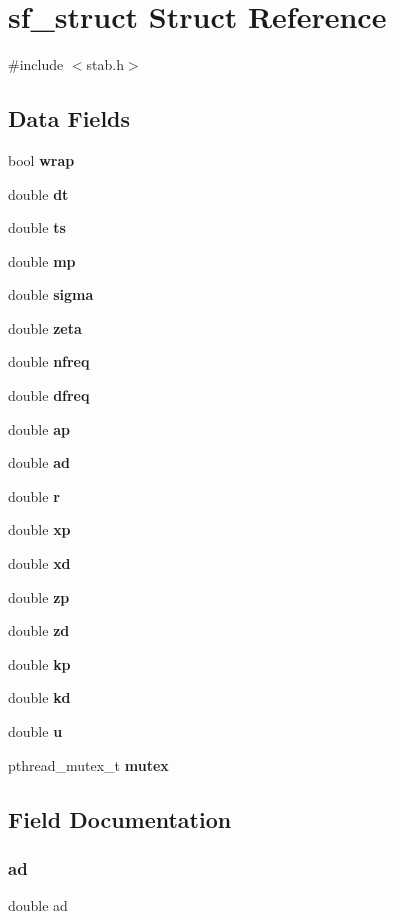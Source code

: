 \section{sf\+\_\+struct Struct Reference}
\label{structsf__struct}


{\ttfamily \#include $<$stab.\+h$>$}

\subsection*{Data Fields}
\begin{DoxyCompactItemize}
\item 
bool \textbf{ wrap}
\item 
double \textbf{ dt}
\item 
double \textbf{ ts}
\item 
double \textbf{ mp}
\item 
double \textbf{ sigma}
\item 
double \textbf{ zeta}
\item 
double \textbf{ nfreq}
\item 
double \textbf{ dfreq}
\item 
double \textbf{ ap}
\item 
double \textbf{ ad}
\item 
double \textbf{ r}
\item 
double \textbf{ xp}
\item 
double \textbf{ xd}
\item 
double \textbf{ zp}
\item 
double \textbf{ zd}
\item 
double \textbf{ kp}
\item 
double \textbf{ kd}
\item 
double \textbf{ u}
\item 
pthread\+\_\+mutex\+\_\+t \textbf{ mutex}
\end{DoxyCompactItemize}


\subsection{Field Documentation}
\mbox{\label{structsf__struct_a48474ce7ab6c9a97aec905ce29810906}} 
\subsubsection{ad}
{\footnotesize\ttfamily double ad}

